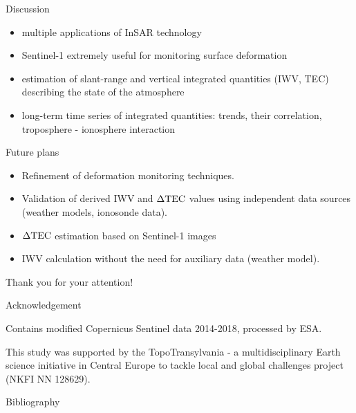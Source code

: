 \documentclass{beamer}
\begin{document}
\begin{frame}{}

    {\Large \fcol Discussion}
    
    \begin{itemize}
        \item multiple applications of InSAR technology
        \item Sentinel-1 extremely useful for monitoring surface deformation
        \item estimation of slant-range and vertical integrated quantities (IWV, TEC) describing the state of the atmosphere
        \item long-term time series of integrated quantities: trends, their correlation, troposphere - ionosphere interaction
    \end{itemize}
    
    \vspace{10pt}
    
    {\Large \fcol Future plans}
    
    \begin{itemize}
        \item Refinement of deformation monitoring techniques.
        \item Validation of derived IWV and $\Delta\mathrm{TEC}$ values using independent data sources (weather models, ionosonde data).
        \item $\Delta\mathrm{TEC}$ estimation based on Sentinel-1 images
        \item IWV calculation without the need for auxiliary data (weather model).
    \end{itemize}
\end{frame}


\begin{frame}
    \begin{center}
        \Huge \fcol
        Thank you for your attention!
    \end{center}
    \vspace{25pt}
    
    \begin{center}
        \Large \fcol \center Acknowledgement
    \end{center}
    \vspace{10pt}
    
    Contains modified Copernicus Sentinel data 2014-2018, processed by ESA.
    \vspace{5pt}
    
    This study was supported by the TopoTransylvania - a multidisciplinary Earth science initiative in Central Europe to tackle local and global challenges project (NKFI NN 128629).
\end{frame}


\begin{frame}[allowframebreaks]{Bibliography}
    \tiny
    
\end{frame}
\end{document}

